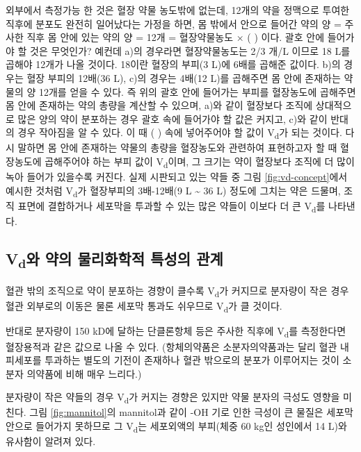 \documentclass[
  11pt,
  krantz2, a4paper, twoside]{krantz}
\theoremstyle{definition}
\theoremstyle{definition}
\theoremstyle{definition}
\theoremstyle{definition}
\theoremstyle{remark}
\begin{document}
외부에서 측정가능 한 것은 혈장 약물 농도밖에 없는데, 12개의 약을
정맥으로 투여한 직후에 분포도 완전히 일어났다는 가정을 하면, 몸 밖에서
안으로 들어간 약의 양 = 주사한 직후 몸 안에 있는 약의 양 = 12개 =
혈장약물농도 × ( ) 이다. 괄호 안에 들어가야 할 것은 무엇인가? 예컨데
a)의 경우라면 혈장약물농도는 2/3 개/L 이므로 18 L를 곱해야 12개가 나올
것이다. 18이란 혈장의 부피(3 L)에 6배를 곱해준 값이다. b)의 경우는 혈장
부피의 12배(36 L), c)의 경우는 4배(12 L)를 곱해주면 몸 안에 존재하는
약물의 양 12개를 얻을 수 있다. 즉 위의 괄호 안에 들어가는 부피를
혈장농도에 곱해주면 몸 안에 존재하는 약의 총량을 계산할 수 있으며, a)와
같이 혈장보다 조직에 상대적으로 많은 양의 약이 분포하는 경우 괄호 속에
들어가야 할 값은 커지고, c)와 같이 반대의 경우 작아짐을 알 수 있다. 이
때 ( ) 속에 넣어주어야 할 값이 V\textsubscript{d}가 되는 것이다. 다시 말하면 몸 안에
존재하는 약물의 총량을 혈장농도와 관련하여 표현하고자 할 때 혈장농도에
곱해주어야 하는 부피 값이 V\textsubscript{d}이며, 그 크기는 약이 혈장보다 조직에 더
많이 녹아 들어가 있을수록 커진다. 실제 시판되고 있는 약들 중 그림 \ref{fig:vd-concept}에서 예시한 것처럼 V\textsubscript{d}가 혈장부피의 3배-12배(9 L \textasciitilde{} 36 L) 정도에
그치는 약은 드물며, 조직 표면에 결합하거나 세포막을 투과할 수 있는
많은 약들이 이보다 더 큰 V\textsubscript{d}를 나타낸다.

\hypertarget{vduxc640-uxc57duxc758-uxbb3cuxb9acuxd654uxd559uxc801-uxd2b9uxc131uxc758-uxad00uxacc4}{%
\subsection{\texorpdfstring{V\textsubscript{d}와 약의 물리화학적 특성의 관계}{Vd와 약의 물리화학적 특성의 관계}}\label{vduxc640-uxc57duxc758-uxbb3cuxb9acuxd654uxd559uxc801-uxd2b9uxc131uxc758-uxad00uxacc4}}

혈관 밖의 조직으로 약이 분포하는 경향이 클수록 V\textsubscript{d}가 커지므로 분자량이
작은 경우 혈관 외부로의 이동은 물론 세포막 통과도 쉬우므로 V\textsubscript{d}가 클
것이다.

반대로 분자량이 150 kD에 달하는 단클론항체 등은 주사한 직후에 V\textsubscript{d}를
측정한다면 혈장용적과 같은 값으로 나올 수 있다. (항체의약품은
소분자의약품과는 달리 혈관 내피세포를 투과하는 별도의 기전이 존재하나
혈관 밖으로의 분포가 이루어지는 것이 소분자 의약품에 비해 매우 느리다.)

분자량이 작은 약들의 경우 V\textsubscript{d}가 커지는 경향은 있지만 약물 분자의 극성도
영향을 미친다. 그림 \ref{fig:mannitol}의 mannitol과 같이 -OH 기로 인한 극성이 큰 물질은 
세포막 안으로 들어가지 못하므로 그 V\textsubscript{d}는 세포외액의 부피(체중 60 kg인
성인에서 14 L)와 유사함이 알려져 있다.
\end{document}
